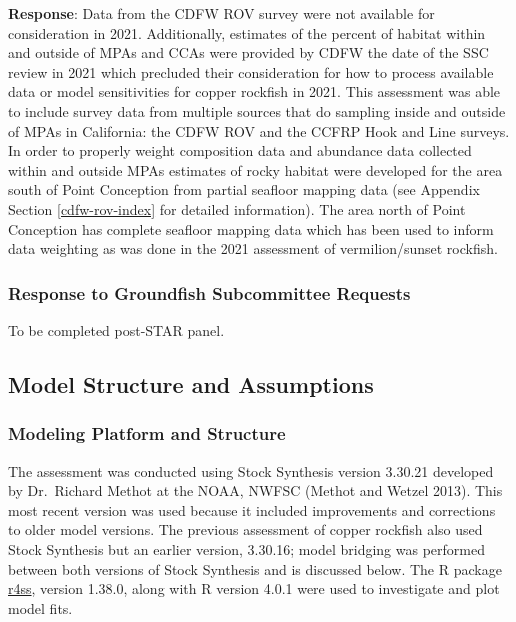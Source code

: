 \documentclass[11pt,
  english,
  letterpaper,
]{article}
\begin{document}
\textbf{Response}: Data from the CDFW ROV survey were not available for consideration in 2021. Additionally, estimates of the percent of habitat within and outside of MPAs and CCAs were provided by CDFW the date of the SSC review in 2021 which precluded their consideration for how to process available data or model sensitivities for copper rockfish in 2021. This assessment was able to include survey data from multiple sources that do sampling inside and outside of MPAs in California: the CDFW ROV and the CCFRP Hook and Line surveys. In order to properly weight composition data and abundance data collected within and outside MPAs estimates of rocky habitat were developed for the area south of Point Conception from partial seafloor mapping data (see Appendix Section \ref{cdfw-rov-index} for detailed information). The area north of Point Conception has complete seafloor mapping data which has been used to inform data weighting as was done in the 2021 assessment of vermilion/sunset rockfish.

\hypertarget{response-to-groundfish-subcommittee-requests}{%
\subsubsection{Response to Groundfish Subcommittee Requests}\label{response-to-groundfish-subcommittee-requests}}

To be completed post-STAR panel.

\hypertarget{model-structure-and-assumptions}{%
\subsection{Model Structure and Assumptions}\label{model-structure-and-assumptions}}

\hypertarget{modeling-platform-and-structure}{%
\subsubsection{Modeling Platform and Structure}\label{modeling-platform-and-structure}}

The assessment was conducted using Stock Synthesis version 3.30.21 developed by Dr.~Richard Methot at the NOAA, NWFSC (Methot and Wetzel 2013). This most recent version was used because it included improvements and corrections to older model versions. The previous assessment of copper rockfish also used Stock Synthesis but an earlier version, 3.30.16; model bridging was performed between both versions of Stock Synthesis and is discussed below. The R package \href{https://github.com/r4ss/r4ss}{r4ss}, version 1.38.0, along with R version 4.0.1 were used to investigate and plot model fits.
\end{document}
